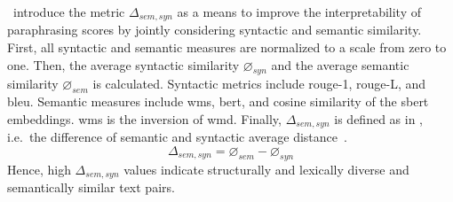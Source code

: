 \citet{gohsen_captions_2023}\ introduce the metric $\Delta_{sem,syn}$ as a means to improve the interpretability of paraphrasing scores by jointly considering syntactic and semantic similarity.
First, all syntactic and semantic measures are normalized to a scale from zero to one.
Then, the average syntactic similarity $\diameter_{syn}$ and the average semantic similarity $\diameter_{sem}$ is calculated.
Syntactic metrics include \ac{rouge}-1, \ac{rouge}-L, and \ac{bleu}.
Semantic measures include \ac{wms}, \ac{bert}, and cosine similarity of the \ac{sbert} embeddings.
\ac{wms} is the inversion of \ac{wmd}.
Finally, $\Delta_{sem,syn}$ is defined as in , i.e.\ the difference of semantic and syntactic average distance~\citep{gohsen_captions_2023}.
\begin{equation}
    \Delta_{sem,syn}=\diameter_{sem}-\diameter_{syn}
    \label{eq:gohsen_delta}
\end{equation}
Hence, high $\Delta_{sem,syn}$ values indicate structurally and lexically diverse and semantically similar text pairs.
